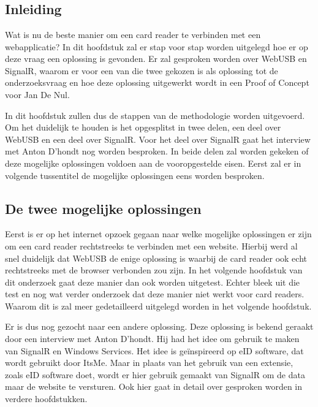 \graphicspath{{graphics/}}
\chapter{}%
\label{ch:Onderzoek en Proof of Concept}
\section{Inleiding}
Wat is nu de beste manier om een card reader te verbinden met een webapplicatie? In dit hoofdstuk zal er stap voor stap worden uitgelegd hoe er op deze vraag een oplossing is gevonden. Er zal gesproken worden over WebUSB en SignalR, waarom er voor een van die twee gekozen is als oplossing tot de onderzoeksvraag en hoe deze oplossing uitgewerkt wordt in een Proof of Concept voor Jan De Nul.

In dit hoofdstuk zullen dus de stappen van de methodologie worden uitgevoerd. Om het duidelijk te houden is het opgesplitst in twee delen, een deel over WebUSB en een deel over SignalR. Voor het deel over SignalR gaat het interview met Anton D'hondt nog worden besproken. In beide delen zal worden gekeken of deze mogelijke oplossingen voldoen aan de vooropgestelde eisen. 
Eerst zal er in volgende tussentitel de mogelijke oplossingen eens worden besproken.


\section{De twee mogelijke oplossingen}
Eerst is er op het internet opzoek gegaan naar welke mogelijke oplossingen er zijn om een card reader rechtstreeks te verbinden met een website. Hierbij werd al snel duidelijk dat WebUSB de enige oplossing is waarbij de card reader ook echt rechtstreeks met de browser verbonden zou zijn. In het volgende hoofdstuk van dit onderzoek gaat deze manier dan ook worden uitgetest. Echter bleek uit die test en nog wat verder onderzoek dat deze manier niet werkt voor card readers. Waarom dit is zal meer gedetailleerd uitgelegd worden in het volgende hoofdstuk. 

Er is dus nog gezocht naar een andere oplossing. Deze oplossing is bekend geraakt door een interview met Anton D’hondt. Hij had het idee om gebruik te maken van SignalR en Windows Services. Het idee is geïnspireerd op eID software, dat wordt gebruikt door ItsMe. Maar in plaats van het gebruik van een extensie, zoals eID software doet, wordt er hier gebruik gemaakt van SignalR om de data maar de website te versturen. Ook hier gaat in detail over gesproken worden in verdere hoofdstukken. 



